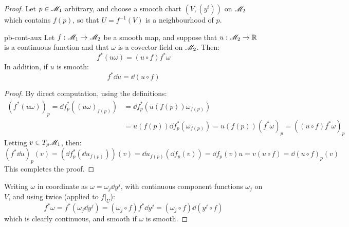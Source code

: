 \begin{proofbox}
  \begin{proof}
    Let $ p \in \mathscr{M}_1 $ arbitrary, and choose a smooth chart $ (V,(y^i)) $ on $ \mathscr{M}_2 $ which contains $ f(p) $, so that $ U = f^{-1}(V) $ is a neighbourhood of $ p $.

    \begin{lemma}{}{pb-cont-aux}
      Let $ f : \mathscr{M}_1 \rightarrow \mathscr{M}_2 $ be a smooth map, and suppose that $ u : \mathscr{M}_2 \rightarrow \mathbb{R} $ is a continuous function and that $ \omega $ is a covector field on $ \mathscr{M}_2 $. Then:
      \begin{equation}
        f^*(u\omega) = (u \circ f) f^*\omega
      \end{equation}
      In addition, if $ u $ is smooth:
      \begin{equation}
        f^* \dd u = \dd (u \circ f)
      \end{equation}
    \end{lemma}

    \begin{proofbox}
      \begin{proof}
        By direct computation, using the definitions:
        \begin{equation*}
          \begin{split}
            (f^*(u\omega))_p = \dd f_p^* ((u\omega)_{f(p)})
            & = \dd f_p^*(u(f(p)) \omega_{f(p)}) \\
            & = u(f(p)) \dd f_p^*(\omega_{f(p)}) = u(f(p)) (f^*\omega)_p = ((u \circ f) f^*\omega)_p
          \end{split}
        \end{equation*}
        Letting $ v \in T_p\mathscr{M}_1 $, then:
        \begin{equation*}
          (f^* \dd u)_p(v) = (\dd f_p^*(\dd u_{f(p)}))(v) = \dd u_{f(p)} (\dd f_p(v)) = \dd f_p(v) u = v(u \circ f) = \dd (u \circ f)_p(v)
        \end{equation*}
        This completes the proof.
      \end{proof}
    \end{proofbox}

    Writing $ \omega $ in coordinate as $ \omega = \omega_j \dd y^j $, with continuous component functions $ \omega_j $ on $ V $, and using  twice (applied to $ f \vert_U $):
    \begin{equation*}
      f^* \omega = f^* (\omega_j \dd y^j) = (\omega_j \circ f) f^* \dd y^j = (\omega_j \circ f) \dd (y^j \circ f)
    \end{equation*}
    which is clearly continuous, and smooth if $ \omega $ is smooth.
  \end{proof}
\end{proofbox}

